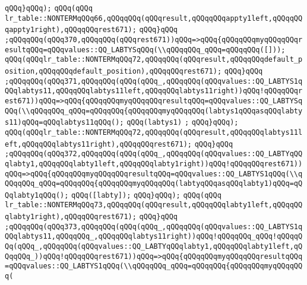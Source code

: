 \verb|qQQq}qQQq);|\newline
\verb|qQQq(qQQq|\newline
\verb|lr_table::NONTERMqQQq66,qQQqqQQq(qQQqresult,qQQqqQQqappty1left,qQQqqQQqappty1right),qQQqqQQqrest671);|\newline
\verb|qQQq}qQQq|\newline
\verb|;qQQqqQQq(qQQq370,qQQqqQQq(qQQqrest671))qQQq=>qQQq{qQQqqQQqmyqQQqqQQqresultqQQq=qQQqvalues::QQ_LABTYSqQQq(\\qQQqqQQq_qQQq=qQQqqQQq([]));|\newline
\verb|qQQq(qQQqlr_table::NONTERMqQQq72,qQQqqQQq(qQQqresult,qQQqqQQqdefault_position,qQQqqQQqdefault_position),qQQqqQQqrest671);|\newline
\verb|qQQq}qQQq|\newline
\verb|;qQQqqQQq(qQQq371,qQQqqQQq(qQQq(qQQq_,qQQqqQQq(qQQqvalues::QQ_LABTYS1qQQqlabtys11,qQQqqQQqlabtys11left,qQQqqQQqlabtys11right))qQQq!qQQqqQQqrest671))qQQq=>qQQq{qQQqqQQqmyqQQqqQQqresultqQQq=qQQqvalues::QQ_LABTYSqQQq(\\qQQqqQQq_qQQq=qQQqqQQq{qQQqqQQqmyqQQqqQQq(labtys1qQQqasqQQqlabtys11)qQQq=qQQqlabtys11qQQq();|\newline
\verb|qQQq(labtys1)|\newline
\verb|;|\newline
\verb|qQQq}qQQq);|\newline
\verb|qQQq(qQQqlr_table::NONTERMqQQq72,qQQqqQQq(qQQqresult,qQQqqQQqlabtys11left,qQQqqQQqlabtys11right),qQQqqQQqrest671);|\newline
\verb|qQQq}qQQq|\newline
\verb|;qQQqqQQq(qQQq372,qQQqqQQq(qQQq(qQQq_,qQQqqQQq(qQQqvalues::QQ_LABTYqQQqlabty1,qQQqqQQqlabty1left,qQQqqQQqlabty1right))qQQq!qQQqqQQqrest671))qQQq=>qQQq{qQQqqQQqmyqQQqqQQqresultqQQq=qQQqvalues::QQ_LABTYS1qQQq(\\qQQqqQQq_qQQq=qQQqqQQq{qQQqqQQqmyqQQqqQQq(labtyqQQqasqQQqlabty1)qQQq=qQQqlabty1qQQq();|\newline
\verb|qQQq([labty]);|\newline
\verb|qQQq}qQQq);|\newline
\verb|qQQq(qQQq|\newline
\verb|lr_table::NONTERMqQQq73,qQQqqQQq(qQQqresult,qQQqqQQqlabty1left,qQQqqQQqlabty1right),qQQqqQQqrest671);|\newline
\verb|qQQq}qQQq|\newline
\verb|;qQQqqQQq(qQQq373,qQQqqQQq(qQQq(qQQq_,qQQqqQQq(qQQqvalues::QQ_LABTYS1qQQqlabtys11,qQQqqQQq_,qQQqqQQqlabtys11right))qQQq!qQQqqQQq_qQQq!qQQqqQQq(qQQq_,qQQqqQQq(qQQqvalues::QQ_LABTYqQQqlabty1,qQQqqQQqlabty1left,qQQqqQQq_))qQQq!qQQqqQQqrest671))qQQq=>qQQq{qQQqqQQqmyqQQqqQQqresultqQQq=qQQqvalues::QQ_LABTYS1qQQq(\\qQQqqQQq_qQQq=qQQqqQQq{qQQqqQQqmyqQQqqQQq(|\newline
